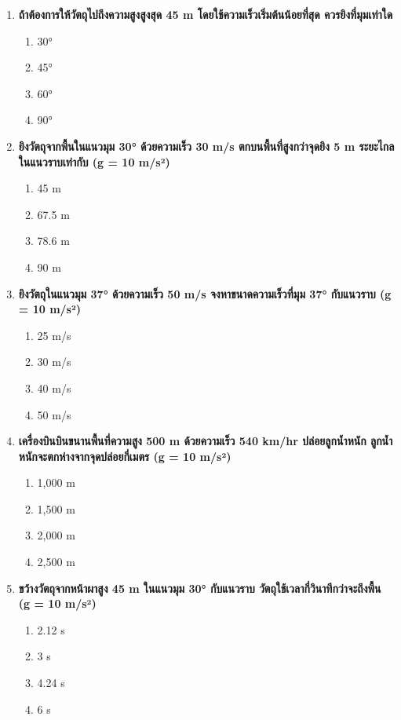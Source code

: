 \documentclass[12pt]{article}
\begin{document}
\begin{enumerate}
\begin{enumerate}[label=\alph*)]
\item ขึ้นกับความเร็วของวัตถุที่ถูกขว้าง
\end{enumerate}
\item \textbf{ถ้าต้องการให้วัตถุไปถึงความสูงสูงสุด 45 m โดยใช้ความเร็วเริ่มต้นน้อยที่สุด ควรยิงที่มุมเท่าใด}
\begin{enumerate}[label=\alph*)]
\item 30°
\item 45°
\item 60°
\item 90°
\end{enumerate}
\item \textbf{ยิงวัตถุจากพื้นในแนวมุม 30° ด้วยความเร็ว 30 m/s ตกบนพื้นที่สูงกว่าจุดยิง 5 m ระยะไกลในแนวราบเท่ากับ (g = 10 m/s²)}
\begin{enumerate}[label=\alph*)]
\item 45 m
\item 67.5 m
\item 78.6 m
\item 90 m
\end{enumerate}
\item \textbf{ยิงวัตถุในแนวมุม 37° ด้วยความเร็ว 50 m/s จงหาขนาดความเร็วที่มุม 37° กับแนวราบ (g = 10 m/s²)}
\begin{enumerate}[label=\alph*)]
\item 25 m/s
\item 30 m/s
\item 40 m/s
\item 50 m/s
\end{enumerate}
\item \textbf{เครื่องบินบินขนานพื้นที่ความสูง 500 m ด้วยความเร็ว 540 km/hr ปล่อยลูกน้ำหนัก ลูกน้ำหนักจะตกห่างจากจุดปล่อยกี่เมตร (g = 10 m/s²)}
\begin{enumerate}[label=\alph*)]
\item 1,000 m
\item 1,500 m
\item 2,000 m
\item 2,500 m
\end{enumerate}
\item \textbf{ขว้างวัตถุจากหน้าผาสูง 45 m ในแนวมุม 30° กับแนวราบ วัตถุใช้เวลากี่วินาทีกว่าจะถึงพื้น (g = 10 m/s²)}
\begin{enumerate}[label=\alph*)]
\item 2.12 s
\item 3 s
\item 4.24 s
\item 6 s
\end{enumerate}

\end{enumerate}
\end{document}
